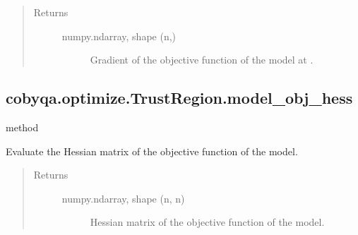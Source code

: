 \documentclass[letterpaper,10pt,english]{sphinxmanual}
\begin{document}
\begin{fulllineitems}
\begin{fulllineitems}
\begin{quote}
\begin{description}
\begin{description}
\end{description}

\item[{Returns}] \leavevmode\begin{description}
\item[{numpy.ndarray, shape (n,)}] \leavevmode
\sphinxAtStartPar
Gradient of the objective function of the model at .

\end{description}

\end{description}\end{quote}

\end{fulllineitems}



\subsection{cobyqa.optimize.TrustRegion.model\_obj\_hess}
\label{\detokenize{refs/generated/cobyqa.optimize.TrustRegion.model_obj_hess:cobyqa-optimize-trustregion-model-obj-hess}}\label{\detokenize{refs/generated/cobyqa.optimize.TrustRegion.model_obj_hess::doc}}
\sphinxAtStartPar
method

\begin{fulllineitems}
\label{\detokenize{refs/generated/cobyqa.optimize.TrustRegion.model_obj_hess:cobyqa.optimize.TrustRegion.model_obj_hess}}
\sphinxAtStartPar
Evaluate the Hessian matrix of the objective function of the model.
\begin{quote}\begin{description}
\item[{Returns}] \leavevmode\begin{description}
\item[{numpy.ndarray, shape (n, n)}] \leavevmode
\sphinxAtStartPar
Hessian matrix of the objective function of the model.

\end{description}

\end{description}\end{quote}

\end{fulllineitems}




\end{fulllineitems}
\end{document}
